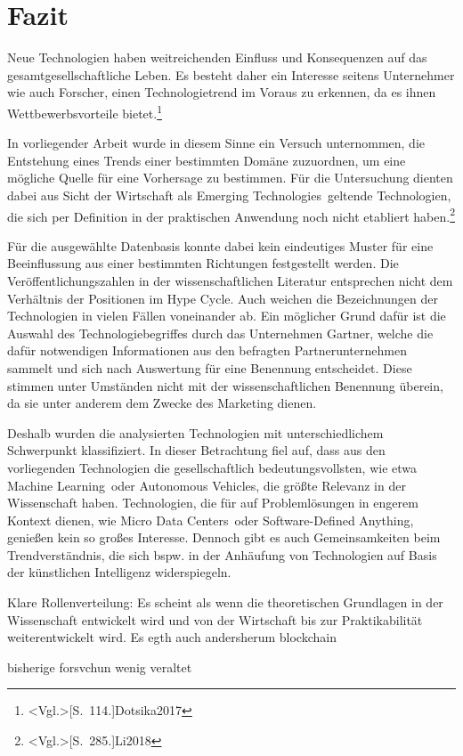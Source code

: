 \section{Fazit}
Neue Technologien haben weitreichenden Einfluss und Konsequenzen auf das ge\-samt\-ge\-sellschaftliche Leben. Es besteht daher ein Interesse seitens Unternehmer wie auch Forscher, einen Technologietrend im Voraus zu erkennen, da es ihnen Wettbewerbsvorteile bietet.\footnote{\citeNP<Vgl.>[S.~114.]{Dotsika2017}}

In vorliegender Arbeit wurde in diesem Sinne ein Versuch unternommen, die Entstehung eines Trends einer bestimmten Domäne zuzuordnen, um eine mögliche Quelle für eine Vorhersage zu bestimmen. Für die Untersuchung dienten dabei aus Sicht der Wirtschaft als \glqq Emerging Technologies\grqq~geltende Technologien, die sich per Definition in der praktischen Anwendung noch nicht etabliert haben.\footnote{\citeNP<Vgl.>[S.~285.]{Li2018}}

Für die ausgewählte Datenbasis konnte dabei kein eindeutiges Muster für eine Beeinflussung aus einer bestimmten Richtungen festgestellt werden. Die Veröffentlichungszahlen in der wissenschaftlichen Literatur entsprechen nicht dem Verhältnis der Positionen im \glqq Hype Cycle\grqq. Auch weichen die Bezeichnungen der Technologien in vielen Fällen voneinander ab. Ein möglicher Grund dafür ist die Auswahl des Technologiebegriffes durch das Unternehmen \glqq Gartner\grqq, welche die dafür notwendigen Informationen aus den befragten Partnerunternehmen sammelt und sich nach Auswertung für eine Benennung entscheidet. Diese stimmen unter Umständen nicht mit der wissenschaftlichen Benennung überein, da sie unter anderem dem Zwecke des Marketing dienen.

Deshalb wurden die analysierten Technologien mit unterschiedlichem Schwerpunkt klassifiziert. In dieser Betrachtung fiel auf, dass aus den vorliegenden Technologien die gesellschaftlich bedeutungsvollsten, wie etwa \glqq Machine Learning\grqq~oder \glqq Autonomous Vehicles\grqq, die größte Relevanz in der Wissenschaft haben. Technologien, die für auf Problemlösungen in engerem Kontext dienen, wie \glqq Micro Data Centers\grqq~oder \glqq Software-Defined Anything\grqq, genießen kein so großes Interesse.
Dennoch gibt es auch Gemeinsamkeiten beim Trendverständnis, die sich bspw. in der Anhäufung von Technologien auf Basis der künstlichen Intelligenz widerspiegeln. 

Klare Rollenverteilung: Es scheint als wenn die theoretischen Grundlagen in der Wissenschaft entwickelt wird und von der Wirtschaft bis zur Praktikabilität weiterentwickelt wird. Es egth auch andersherum blockchain


bisherige forsvchun wenig veraltet

%
%
%

